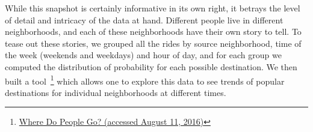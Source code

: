 \documentclass[twocolumn]{article}
\begin{document}
While this snapshot is certainly informative in its own right, it betrays the level of detail and intricacy of the data at hand. Different people live in different neighborhoods, and each of these neighborhoods have their own story to tell. To tease out these stories, we grouped all the rides by source neighborhood, time of the week (weekends and weekdays) and hour of day, and for each group we computed the distribution of probability for each possible destination. We then built a tool~\footnote{\href{http://bit.ly/nyc_taxi}{Where Do People Go? (accessed August 11, 2016)}} which allows one to explore this data to see trends of popular destinations for individual neighborhoods at different times. 


\begin{figure}[t]
 

\end{figure}
\end{document}
